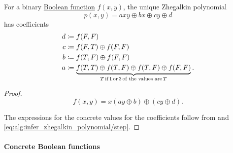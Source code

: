 \begin{proposition}\label{thm:binary_boolean_function_zhegalkin_polynomial}
  For a binary \hyperref[def:boolean_function]{Boolean function} \( f(x, y) \), the unique Zhegalkin polynomial
  \begin{equation}\label{eq:thm:binary_boolean_function_zhegalkin_polynomial}
    p(x, y) = axy \oplus bx \oplus cy \oplus d
  \end{equation}
  has coefficients
  \begin{align*}
    d &\coloneqq f(F, F) \\
    c &\coloneqq f(F, T) \oplus f(F, F) \\
    b &\coloneqq f(T, F) \oplus f(F, F) \\
    a &\coloneqq \underbrace{f(T, T) \oplus f(T, F) \oplus f(T, F) \oplus f(F, F)}_{T \T*{if} 1 \T*{or} 3 \T*{of the values are} T}.
  \end{align*}
\end{proposition}
\begin{proof}
  \begin{equation*}
    f(x, y) = x(ay \oplus b) \oplus (cy \oplus d).
  \end{equation*}

  The expressions for the concrete values for the coefficients follow from  and \eqref{eq:alg:infer_zhegalkin_polynomial/step}.
\end{proof}

\paragraph{Concrete Boolean functions}

